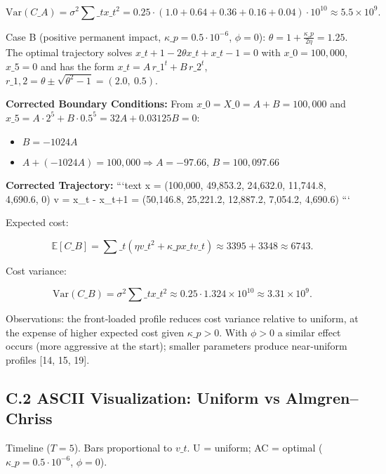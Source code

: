 \documentclass[11pt,a4paper]{article}
\begin{document}
\begin{equation}
\mathrm{Var}(C\_A) = \sigma^2\sum\_t x\_t^2 = 0.25\cdot(1.0+0.64+0.36+0.16+0.04)\cdot 10^{10} \approx 5.5\times 10^9.
\end{equation}

Case B (positive permanent impact, $\kappa\_p=0.5\cdot 10^{-6}$, $\phi=0$): $\theta = 1 + \tfrac{\kappa\_p}{2\eta} = 1.25$. The optimal trajectory solves $x\_{t+1}-2\theta x\_t + x\_{t-1}=0$ with $x\_0=100,000$, $x\_5=0$ and has the form $x\_t = A\,r\_1^t + B\,r\_2^t$, $r\_{1,2}=\theta\pm\sqrt{\theta^2-1}=(2.0,\ 0.5)$. 

\textbf{Corrected Boundary Conditions:}
From $x\_0 = X\_0 = A + B = 100,000$ and $x\_5 = A \cdot 2^5 + B \cdot 0.5^5 = 32A + 0.03125B = 0$:
\begin{itemize}
\item $B = -1024A$ 
\item $A + (-1024A) = 100,000 \Rightarrow A = -97.66$, $B = 100,097.66$
\end{itemize}

\textbf{Corrected Trajectory:}
```text
x = (100,000, 49,853.2, 24,632.0, 11,744.8, 4,690.6, 0)
v = x\_t - x\_{t+1} = (50,146.8, 25,221.2, 12,887.2, 7,054.2, 4,690.6)
```

Expected cost:

\begin{equation}
\mathbb{E}[C\_B] = \sum\_t (\eta v\_t^2 + \kappa\_p x\_t v\_t) \approx 3395 + 3348 \approx 6743.
\end{equation}

Cost variance:

\begin{equation}
\mathrm{Var}(C\_B) = \sigma^2\sum\_t x\_t^2 \approx 0.25\cdot 1.324\times 10^{10} \approx 3.31\times 10^9.
\end{equation}

Observations: the front‑loaded profile reduces cost variance relative to uniform, at the expense of higher expected cost given $\kappa\_p>0$. With $\phi>0$ a similar effect occurs (more aggressive at the start); smaller parameters produce near‑uniform profiles [14, 15, 19].

\subsection{C.2 ASCII Visualization: Uniform vs Almgren–Chriss}

Timeline ($T=5$). Bars proportional to $v\_t$. U = uniform; AC = optimal ($\kappa\_p=0.5\cdot 10^{-6}$, $\phi=0$).
\end{document}
